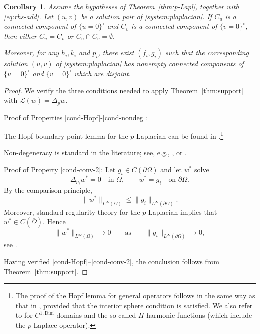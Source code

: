 \documentclass[11pt,oneside,english]{amsart}
\numberwithin{equation}{section}
\theoremstyle{plain}
\newtheorem{corollary}{Corollary}
\numberwithin{equation}{section}
\begin{document}
\begin{corollary}
\label{cor:p-coin}
Assume the hypotheses of Theorem~\ref{thm:p-Lapl}, together with
\eqref{eq:rhs-add}.
Let $(u,v)$ be a solution pair of \eqref{system:plaplacian}. If $C_u$ is a connected component of $\{u=0\}^\circ$ and
$C_v$ is a connected component of $\{v=0\}^\circ$, then either $
C_u=C_v $ or $C_u\cap C_v=\emptyset.$

Moreover, for any $h_i,k_i$ and $p_i$, there exist $(f_i,g_i)$ such that the corresponding
solution $(u,v)$ of \eqref{system:plaplacian} has nonempty connected
components of $\{u=0\}^\circ$ and $\{v=0\}^\circ$ which are disjoint.
\end{corollary}
\begin{proof}
We verify the three conditions needed to apply Theorem~\ref{thm:support} with
$
\mathcal L(w)=\Delta_{p}w.
$

\medskip
\noindent
\underline{Proof of Properties \ref{cond-Hopf}-\ref{cond-nondeg}:}

The Hopf boundary point lemma for the $p$-Laplacian can be found in \cite[Proposition 3.3.1]{Tol84}.\footnote{The proof of the Hopf lemma for general operators follows in the same way as that in \cite{Hopf1952}, provided that the interior sphere condition is satisfied. We also refer to \cite{Mi-Sh} for $C^{1,\text{Dini}}$-domains and the so-called $H$-harmonic functions (which include the $p$-Laplace operator).}

Non-degeneracy is standard in the literature; see, e.g., \cite[(2.14)]{JeoSha24}, or  \cite[Lemma 3.1]{KKPS}.






\medskip
\noindent
\underline{Proof of Property \ref{cond-conv-2}:}
Let $g_i\in C(\partial\Omega)$ and let $w^*$ solve
\[
\Delta_{p_i} w^* = 0 \quad\text{in }\Omega,\qquad
w^* = g_i \quad\text{on }\partial\Omega.
\]
By the comparison principle,
\[
\|w^*\|_{L^\infty(\Omega)}\le \|g_i\|_{L^\infty(\partial\Omega)}.
\]
Moreover, standard regularity theory for the $p$-Laplacian implies that $w^*\in C(\overline{\Omega})$.
Hence
$$\|w^*\|_{L^\infty(\Omega)}\to 0
\qquad\text{as}\qquad
\|g_i\|_{L^\infty(\partial\Omega)}\to 0,$$
see \cite{Lin19,Tol84}.

Having verified \ref{cond-Hopf}--\ref{cond-conv-2}, the conclusion follows from
Theorem~\ref{thm:support}.
\end{proof}
\end{document}
